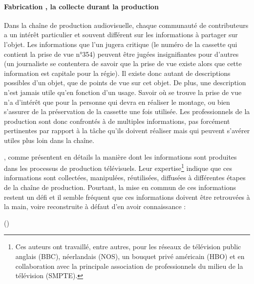 \paragraph{Fabrication , la collecte durant la production}
Dans la chaîne de production audiovisuelle, chaque communauté de contributeurs a un intérêt particulier et souvent différent sur les informations à partager sur l'objet. 
Les informations que l'un jugera critique (le numéro de la cassette qui contient la prise de vue n°354) peuvent être jugées insignifiantes pour d'autres (un journaliste se contentera de savoir que la prise de vue existe alors que cette information est capitale pour la régie). 
Il existe donc autant de descriptions possibles d'un objet, que de points de vue sur cet objet. 
De plus, une description n'est jamais utile qu'en fonction d'un usage. 
Savoir où se trouve la prise de vue n'a d'intérêt que pour la personne qui devra en réaliser le montage, ou bien s'assurer de la préservation de la cassette une fois utilisée. 
Les professionnels de la production sont donc confrontés à de multiples informations, pas forcément pertinentes par rapport à la tâche qu'ils doivent réaliser mais qui peuvent s'avérer utiles plus loin dans la chaîne.  

\citeauthor{Rayers2002}, comme \citeauthor{Austerberry2004} présentent en détails la manière dont les informations sont produites dans les processus de production télévisuels. 
Leur expertise\footnote{Ces auteurs ont travaillé, entre autres, pour les réseaux de télévision public anglais (BBC), néerlandais (NOS), un bouquet privé américain (HBO) et en collaboration avec la principale association de professionnels du milieu de la télévision (SMPTE).} indique que ces informations sont collectées, manipulées,  réutilisées, diffusées à différentes étapes de la chaîne de production. 
Pourtant, la mise en commun de ces informations restent un défi et il semble fréquent que ces informations doivent être retrouvées à la main, voire reconstruite à défaut d'en avoir connaissance :

 (\cite[p.22, Metadata in the Workflow]{Austerberry2004})

